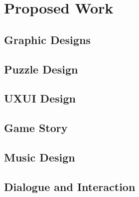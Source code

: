 \documentclass[12pt,oneside,openright,a4paper]{explo-english-project}
\begin{document}




\chapter{Proposed Work}


\section{Graphic Designs}


\section{Puzzle Design}


\section{UXUI Design}


\section{Game Story}


\section{Music Design}


\section{Dialogue and Interaction}



\end{document}

